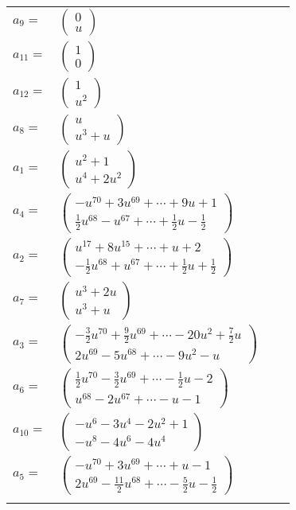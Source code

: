 \documentclass[1p]{elsarticle_modified}
\theoremstyle{definition}
\begin{document}
\begin{tabular}{m{7pt} m{180pt} m{7pt} m{180pt} }
\flushright $a_{9}=$&$\begin{pmatrix}0\\u\end{pmatrix}$ \\
\flushright $a_{11}=$&$\begin{pmatrix}1\\0\end{pmatrix}$ \\
\flushright $a_{12}=$&$\begin{pmatrix}1\\u^2\end{pmatrix}$ \\
\flushright $a_{8}=$&$\begin{pmatrix}u\\u^3+u\end{pmatrix}$ \\
\flushright $a_{1}=$&$\begin{pmatrix}u^2+1\\u^4+2 u^2\end{pmatrix}$ \\
\flushright $a_{4}=$&$\begin{pmatrix}- u^{70}+3 u^{69}+\cdots+9 u+1\\\frac{1}{2} u^{68}- u^{67}+\cdots+\frac{1}{2} u-\frac{1}{2}\end{pmatrix}$ \\
\flushright $a_{2}=$&$\begin{pmatrix}u^{17}+8 u^{15}+\cdots+u+2\\-\frac{1}{2} u^{68}+u^{67}+\cdots+\frac{1}{2} u+\frac{1}{2}\end{pmatrix}$ \\
\flushright $a_{7}=$&$\begin{pmatrix}u^3+2 u\\u^3+u\end{pmatrix}$ \\
\flushright $a_{3}=$&$\begin{pmatrix}-\frac{3}{2} u^{70}+\frac{9}{2} u^{69}+\cdots-20 u^2+\frac{7}{2} u\\2 u^{69}-5 u^{68}+\cdots-9 u^2- u\end{pmatrix}$ \\
\flushright $a_{6}=$&$\begin{pmatrix}\frac{1}{2} u^{70}-\frac{3}{2} u^{69}+\cdots-\frac{1}{2} u-2\\u^{68}-2 u^{67}+\cdots- u-1\end{pmatrix}$ \\
\flushright $a_{10}=$&$\begin{pmatrix}- u^6-3 u^4-2 u^2+1\\- u^8-4 u^6-4 u^4\end{pmatrix}$ \\
\flushright $a_{5}=$&$\begin{pmatrix}- u^{70}+3 u^{69}+\cdots+u-1\\2 u^{69}-\frac{11}{2} u^{68}+\cdots-\frac{5}{2} u-\frac{1}{2}\end{pmatrix}$\\&\end{tabular}
\end{document}
